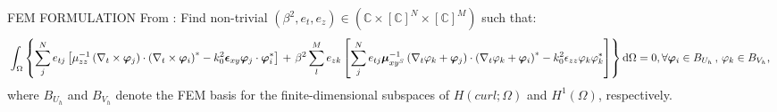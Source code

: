 \documentclass[debug]{beamer} %
\def\\{ }%
\newcommand{\hcurl}[1]{H (curl;#1)}
\newcommand{\hone}[1]{H^1(#1)}
\newcommand{\testhcurl}[0]{\bm{\varphi}}
\newcommand{\testhone}[0]{\varphi}
\begin{document}
\begin{frame}
\begin{columns}
\begin{column}{0.45\textwidth}
{        \vfill
        \begin{block}{\boxnumber FEM FORMULATION}
        From \textcite{jin14}:
	        Find non-trivial $\left(\beta^2,{e_t}, {e_z}\right) \in (\mathbb{C} \times [\mathbb{C}]^N \times [\mathbb{C}]^M)$ such that:
			\begin{equation}
				\renewcommand{\arraystretch}{1.5}%
	  			 \scalebox{0.9}{%
					$\begin{multlined}\label{eq:fem-hcurl-disc-1}
					    \int_\Omega\left\{\sum_{j}^Ne_{tj}\left[\mu_{zz}^{-1} \left( \nabla_t \times \testhcurl_j \right)\cdot \left( \nabla_t \times \testhcurl_i \right)^*- k_0^2 \bm{\epsilon}_{xy}\testhcurl_j\cdot\testhcurl_i^*\right]\right.\\
					     +\left.\beta^2\sum_{l}^M e_{zk} \left[ \sum_{j}^Ne_{tj} \bm{\mu}_{xy^S}^{-1} \left( \nabla_t \testhone_k +\testhcurl_j \right)\cdot \left(\nabla_t \testhone_k +\testhcurl_i \right)^*-k_0^2\epsilon_{zz} \testhone_k\testhone_k^*\right]\right\}\mathrm{d}\Omega = 0,\\
					     \forall \testhcurl_i \in B_{U_h}\,,\, \testhone_k \in B_{V_h}\text{,}
					\end{multlined}$
				}
			\end{equation}%
			where $B_{U_h}$ and $B_{V_h}$ denote the FEM basis for the finite-dimensional subspaces of $\hcurl{\Omega}$ and $\hone{\Omega}$, respectively.
        \end{block}

}
\end{column}
\end{columns}
\end{frame}
\end{document}
